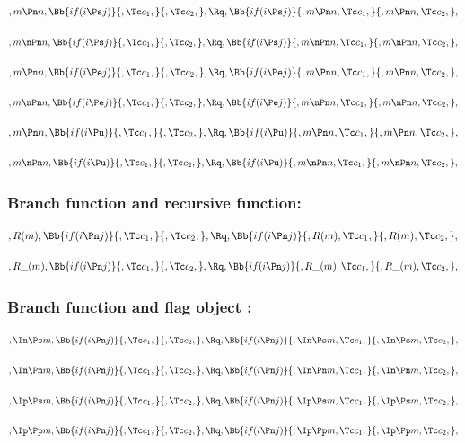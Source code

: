 \[,m \Pn n, \Bb{if(i \Ps j)}{,\Tc c_1,}{,\Tc c_2,}, \Rq , \Bb{if(i \Ps j)}{,m \Pn n,\Tc c_1,}{,m \Pn n,\Tc c_2,},\]
\bigskip
\bigskip

\[,m \nPn n, \Bb{if(i \Ps j)}{,\Tc c_1,}{,\Tc c_2,}, \Rq , \Bb{if(i \Ps j)}{,m \nPn n,\Tc c_1,}{,m \nPn n,\Tc c_2,},\]
\bigskip
\bigskip

\[,m \Pn n, \Bb{if(i \Pe j)}{,\Tc c_1,}{,\Tc c_2,}, \Rq , \Bb{if(i \Pe j)}{,m \Pn n,\Tc c_1,}{,m \Pn n,\Tc c_2,},\]
\bigskip
\bigskip

\[,m \nPn n, \Bb{if(i \Pe j)}{,\Tc c_1,}{,\Tc c_2,}, \Rq , \Bb{if(i \Pe j)}{,m \nPn n,\Tc c_1,}{,m \nPn n,\Tc c_2,},\]
\bigskip
\bigskip

\[,m \Pn n, \Bb{if(i \Pu)}{,\Tc c_1,}{,\Tc c_2,}, \Rq , \Bb{if(i \Pu)}{,m \Pn n,\Tc c_1,}{,m \Pn n,\Tc c_2,},\]
\bigskip
\bigskip

\[,m \nPn n, \Bb{if(i \Pu)}{,\Tc c_1,}{,\Tc c_2,}, \Rq , \Bb{if(i \Pu)}{,m \nPn n,\Tc c_1,}{,m \nPn n,\Tc c_2,},\]
\bigskip
\bigskip



\bigskip
\bigskip
\bigskip
\bigskip
\subsubsection{Branch function and recursive function:}
\[,R(m), \Bb{if(i \Pn j)}{,\Tc c_1,}{,\Tc c_2,}, \Rq , \Bb{if(i \Pn j)}{,R(m),\Tc c_1,}{,R(m),\Tc c_2,},\]
\bigskip
\bigskip

\[,R\_(m), \Bb{if(i \Pn j)}{,\Tc c_1,}{,\Tc c_2,}, \Rq , \Bb{if(i \Pn j)}{,R\_(m),\Tc c_1,}{,R\_(m),\Tc c_2,},\]
\bigskip
\bigskip


\bigskip
\bigskip
\bigskip
\bigskip
\subsubsection{Branch function and flag object :}
\[,\In \Ps m, \Bb{if(i \Pn j)}{,\Tc c_1,}{,\Tc c_2,}, \Rq , \Bb{if(i \Pn j)}{,\In \Ps m,\Tc c_1,}{,\In \Ps m,\Tc c_2,},\]
\bigskip
\bigskip

\[,\In \Pn m, \Bb{if(i \Pn j)}{,\Tc c_1,}{,\Tc c_2,}, \Rq , \Bb{if(i \Pn j)}{,\In \Pn m,\Tc c_1,}{,\In \Pn m,\Tc c_2,},\]
\bigskip
\bigskip

\[,\Ip \Ps m, \Bb{if(i \Pn j)}{,\Tc c_1,}{,\Tc c_2,}, \Rq , \Bb{if(i \Pn j)}{,\Ip \Ps m,\Tc c_1,}{,\Ip \Ps m,\Tc c_2,},\]
\bigskip
\bigskip

\[,\Ip \Pp m, \Bb{if(i \Pn j)}{,\Tc c_1,}{,\Tc c_2,}, \Rq , \Bb{if(i \Pn j)}{,\Ip \Pp m,\Tc c_1,}{,\Ip \Pp m,\Tc c_2,},\]
\bigskip
\bigskip



